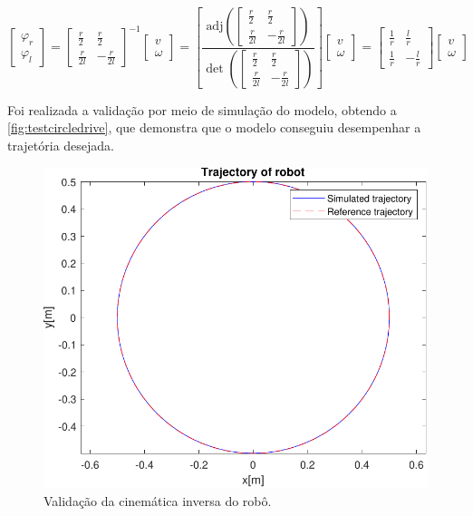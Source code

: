 \begin{equation}\label{eq:cinematicainversa}
\begin{bmatrix}
	\varphi_r \\ \varphi_l
\end{bmatrix} = \begin{bmatrix}
	\frac{r}{2} & \frac{r}{2} \\
	\frac{r}{2l} & -\frac{r}{2l} 
\end{bmatrix} ^{-1} \begin{bmatrix}
v \\ \omega
\end{bmatrix} = \left[ \frac{\text{adj}\left(\begin{bmatrix}
\frac{r}{2} & \frac{r}{2} \\
\frac{r}{2l} & -\frac{r}{2l} 
\end{bmatrix}\right)}{\det{\left(\begin{bmatrix}
\frac{r}{2} & \frac{r}{2} \\
\frac{r}{2l} & -\frac{r}{2l} 
\end{bmatrix}\right)}} \right] \begin{bmatrix}
v \\ \omega
\end{bmatrix} = \begin{bmatrix}
\frac{1}{r} & \frac{l}{r} \\
\frac{1}{r} & -\frac{l}{r} 
\end{bmatrix} \begin{bmatrix}
v \\ \omega \end{bmatrix}
\end{equation}

Foi realizada a validação por meio de simulação do modelo, obtendo a \autoref{fig:testcircledrive}, que demonstra que o modelo conseguiu desempenhar a trajetória desejada.

\begin{figure}[H]
	\centering
	\includegraphics[width=0.5\linewidth]{img/testCircleDrive}
	\caption{Validação da cinemática inversa do robô.}
	\label{fig:testcircledrive}
\end{figure}




